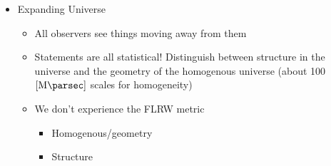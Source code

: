 \begin{itemize}
\begin{itemize}
\begin{itemize}
        \end{itemize}

    \end{itemize}

  \item Expanding Universe

    \begin{itemize}
        
      \item All observers see things moving away from them

      \item Statements are all statistical! Distinguish between structure in the universe and the geometry of the homogenous universe (about 100$[\si{\mega\parsec}]$ scales for homogeneity)

      \item We don't experience the FLRW metric

        \begin{itemize}

          \item Homogenous/geometry

          \item Structure

        \end{itemize}

    \end{itemize}

\end{itemize}




